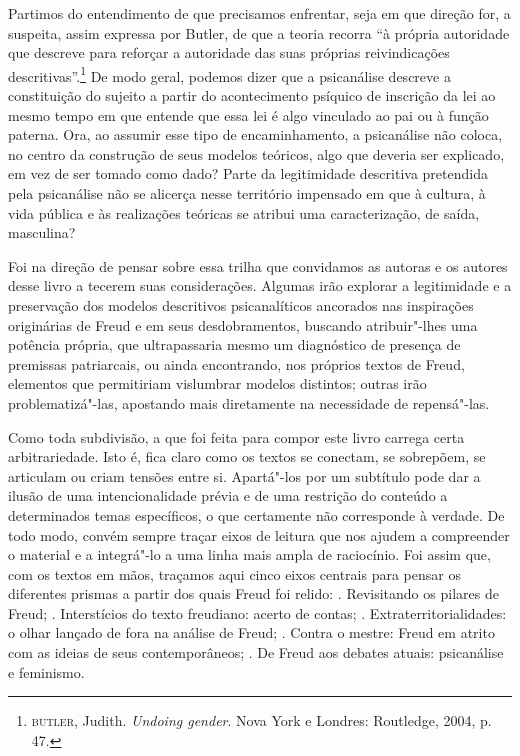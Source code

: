 Partimos do entendimento de que precisamos enfrentar, seja em que
direção for, a suspeita, assim expressa por Butler, de que a teoria
recorra ``à própria autoridade que descreve para reforçar a autoridade
das suas próprias reivindicações descritivas''.\footnote{\textsc{butler}, Judith. \emph{Undoing
gender}. Nova York e Londres: Routledge, 2004, p. 47.} De modo geral,
podemos dizer que a psicanálise descreve a constituição do sujeito a
partir do acontecimento psíquico de inscrição da lei ao mesmo tempo em
que entende que essa lei é algo vinculado ao pai ou à função paterna.
Ora, ao assumir esse tipo de encaminhamento, a psicanálise não coloca,
no centro da construção de seus modelos teóricos, algo que deveria ser
explicado, em vez de ser tomado como dado? Parte da legitimidade
descritiva pretendida pela psicanálise não se alicerça nesse
território impensado em que à cultura, à vida pública e às realizações
teóricas se atribui uma caracterização, de saída, masculina?

Foi na direção de pensar sobre essa trilha que convidamos as autoras e
os autores desse livro a tecerem suas considerações. Algumas irão
explorar a legitimidade e a preservação dos modelos descritivos
psicanalíticos ancorados nas inspirações originárias de Freud e em seus
desdobramentos, buscando atribuir"-lhes uma potência própria, que
ultrapassaria mesmo um diagnóstico de presença de premissas patriarcais,
ou ainda encontrando, nos próprios textos de Freud, elementos que
permitiriam vislumbrar modelos distintos; outras irão problematizá"-las,
apostando mais diretamente na necessidade de repensá"-las.

\asterisc

Como toda subdivisão, a que foi feita para compor este livro carrega
certa arbitrariedade. Isto é, fica claro como os textos se conectam, se
sobrepõem, se articulam ou criam tensões entre si. Apartá"-los por um
subtítulo pode dar a ilusão de uma intencionalidade prévia e de uma
restrição do conteúdo a determinados temas específicos, o que certamente
não corresponde à verdade. De todo modo, convém sempre traçar eixos de
leitura que nos ajudem a compreender o material e a integrá"-lo a uma
linha mais ampla de raciocínio. Foi assim que, com os textos em mãos,
traçamos aqui cinco eixos centrais para pensar os diferentes prismas a
partir dos quais Freud foi relido: . Revisitando os pilares de Freud;
. Interstícios do texto freudiano: acerto de contas; .
Extraterritorialidades: o olhar lançado de fora na análise de Freud; .
Contra o mestre: Freud em atrito com as ideias de seus contemporâneos;
. De Freud aos debates atuais: psicanálise e feminismo.

